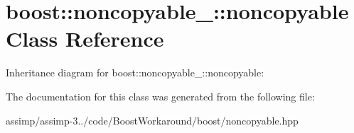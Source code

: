\hypertarget{classboost_1_1noncopyable___1_1noncopyable}{\section{boost\+:\+:noncopyable\+\_\+\+:\+:noncopyable Class Reference}
\label{classboost_1_1noncopyable___1_1noncopyable}
}


Inheritance diagram for boost\+:\+:noncopyable\+\_\+\+:\+:noncopyable\+:


The documentation for this class was generated from the following file\+:\begin{DoxyCompactItemize}
\item 
assimp/assimp-\/3../code/\+Boost\+Workaround/boost/noncopyable.\+hpp\end{DoxyCompactItemize}
